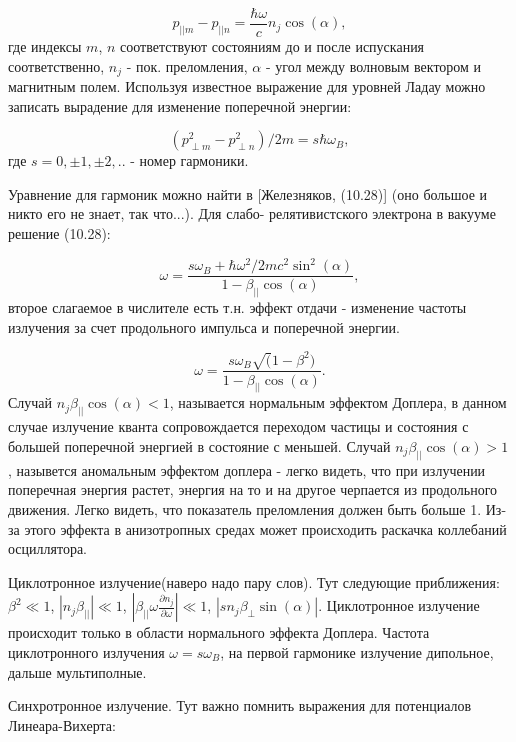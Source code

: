 \documentclass[10pt, a4paper]{article}
\begin{document}
\begin{equation}
    p_{|| m} - p_{|| n} = \frac{\hbar\omega}{c}n_j \cos(\alpha),
\end{equation}
где индексы $m$, $n$ соответствуют состояниям до и после испускания соответственно, $n_j$ - пок. преломления, $\alpha$ -
угол между волновым вектором и магнитным полем. Используя известное выражение для уровней Ладау можно записать вырадение
для изменение поперечной энергии:

\begin{equation}
    (p_{\perp m}^2 - p_{\perp n}^2)/2m = s\hbar\omega_B,
\end{equation}
где $s = 0, \pm1, \pm2, ..$ - номер гармоники.

Уравнение для гармоник можно найти в [Железняков, (10.28)] (оно большое и никто его не знает, так что...). Для слабо-
релятивистского электрона в вакууме решение (10.28):

\begin{equation}
    \omega = \frac{s\omega_B + \hbar \omega^2/2mc^2 \sin^2(\alpha)}{1-\beta_{||}\cos(\alpha)},
\end{equation}
второе слагаемое в числителе есть т.н. эффект отдачи - изменение частоты излучения за счет продольного импульса и
поперечной энергии.

\begin{equation}
    \omega = \frac{s\omega_B \sqrt(1-\beta^2)}{1-\beta_{||}\cos(\alpha)}.
\end{equation}
Случай $n_j\beta_{||}\cos(\alpha)<1$, называется нормальным эффектом Доплера, в данном случае излучение кванта
сопровождается переходом частицы и состояния с большей поперечной энергией в состояние с меньшей. Случай $n_j\beta_{||}\cos(\alpha)>1$,
назывется аномальным эффектом доплера - легко видеть, что при излучении поперечная энергия растет, энергия на то и на 
другое черпается из продольного движения. Легко видеть, что показатель преломления должен быть больше 1.
Из-за этого эффекта в анизотропных средах может происходить раскачка коллебаний осциллятора.

Циклотронное излучение(наверо надо пару слов). Тут следующие приближения: $\beta^2\ll1$, $|n_j\beta_{||}|\ll1$,
$|\beta_{||}\omega\frac{\partial n_j}{\partial \omega}|\ll1$, $|sn_j\beta_{\perp}\sin(\alpha)|$. Циклотронное 
излучение происходит только в области нормального эффекта Доплера. Частота циклотронного излучения $\omega=s\omega_B$,
на первой гармонике излучение дипольное, дальше мультиполные.

Синхротронное излучение.
Тут важно помнить выражения для потенциалов Линеара-Вихерта:
\end{document}
